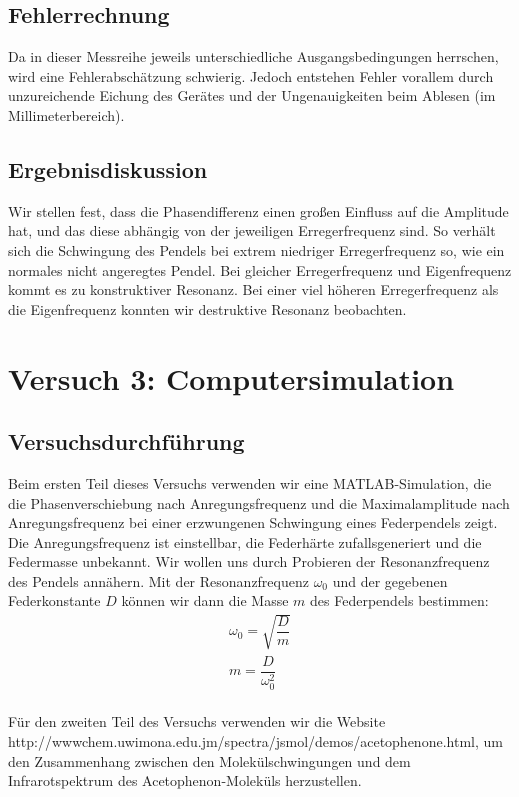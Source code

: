 \documentclass{scrartcl}
\begin{document}
\subsection{Fehlerrechnung}
Da in dieser Messreihe jeweils unterschiedliche Ausgangsbedingungen herrschen, wird eine Fehlerabschätzung schwierig. Jedoch entstehen Fehler vorallem durch unzureichende Eichung des Gerätes und der Ungenauigkeiten beim Ablesen (im Millimeterbereich).

\subsection{Ergebnisdiskussion}
Wir stellen fest, dass die Phasendifferenz einen großen Einfluss auf die Amplitude hat, und das diese abhängig von der jeweiligen Erregerfrequenz sind. So verhält sich die Schwingung des Pendels bei extrem niedriger Erregerfrequenz so, wie ein normales nicht angeregtes Pendel. Bei gleicher Erregerfrequenz und Eigenfrequenz kommt es zu konstruktiver Resonanz. Bei einer viel höheren Erregerfrequenz als die Eigenfrequenz konnten wir destruktive Resonanz beobachten. 


\section{Versuch 3: Computersimulation}
\subsection{Versuchsdurchführung}
Beim ersten Teil dieses Versuchs verwenden wir eine MATLAB-Simulation, die die Phasenverschiebung nach Anregungsfrequenz und die Maximalamplitude nach Anregungsfrequenz bei einer erzwungenen Schwingung eines Federpendels zeigt. Die Anregungsfrequenz ist einstellbar, die Federhärte zufallsgeneriert und die Federmasse unbekannt. Wir wollen uns durch Probieren der Resonanzfrequenz des Pendels annähern. Mit der Resonanzfrequenz $\omega_{0}$ und der gegebenen Federkonstante $D$ können wir dann die Masse $m$ des Federpendels bestimmen:
\begin{align*}
\omega_{0} = \sqrt{\dfrac{D}{m}} \\
m = \dfrac{D}{\omega_{0}^2}
\end{align*}
\\
Für den zweiten Teil des Versuchs verwenden wir die Website \\http://wwwchem.uwimona.edu.jm/spectra/jsmol/demos/acetophenone.html, um den Zusammenhang zwischen den Molekülschwingungen und dem Infrarotspektrum des Acetophenon-Moleküls herzustellen.
\end{document}
